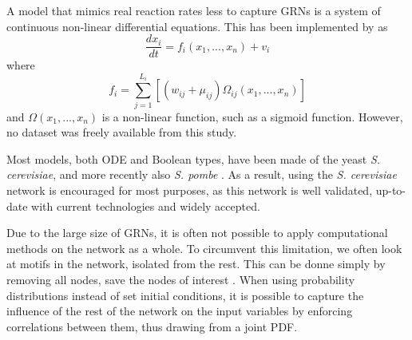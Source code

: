 \documentclass[../main.tex]{subfiles}
\begin{document}
A model that mimics real reaction rates less to capture GRNs is a system of continuous non-linear differential equations.
This has been implemented by \cite{qian2008inference} as
%
\begin{equation}
\frac{dx_i}{dt} = f_i(x_1,...,x_n) + v_i
\end{equation}
%
where
%
\begin{equation}
f_i = \sum_{j=1}^{L_i} [(w_{ij}+ \mu_{ij})\Omega_{ij}(x_1,...,x_n)]
\end{equation}
%
and $\Omega(x_1,...,x_n)$ is a non-linear function, such as a sigmoid function.
However, no dataset was freely available from this study.

Most models, both ODE and Boolean types, have been made of the yeast \textit{S. cerevisiae}, and more recently also \textit{S. pombe} \cite{ferrell2011modeling}. As a result, using the \textit{S. cerevisiae} network is encouraged for most purposes, as this network is well validated, up-to-date with current technologies and widely accepted.

Due to the large size of GRNs, it is often not possible to apply computational methods on the network as a whole.
To circumvent this limitation, we often look at motifs in the network, isolated from the rest.
This can be donne simply by removing all nodes, save the nodes of interest \cite{zhang2012chaotic}.
When using probability distributions instead of set initial conditions, it is possible to capture the influence of the rest of the network on the input variables by enforcing correlations between them, thus drawing from a joint PDF.
\end{document}
